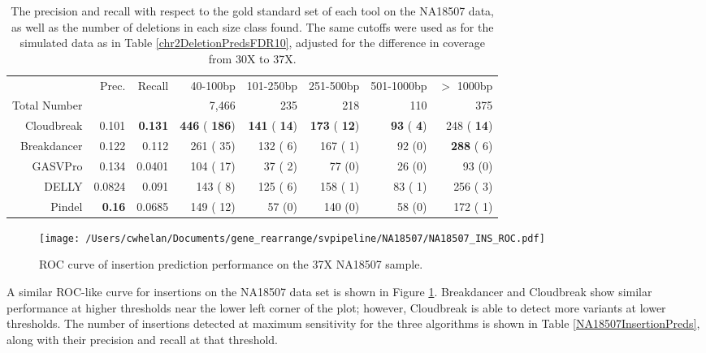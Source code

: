 \documentclass[11pt]{article}
\begin{document}
\begin{table}[t]
\begin{center}
\begin{tabular}{rrr|rrrrr}
  \hline
 & Prec. & Recall & 40-100bp & 101-250bp & 251-500bp & 501-1000bp & $>$ 1000bp \\ 
Total Number & & & 7,466 & 235 & 218 & 110 & 375 \\
  \hline
Cloudbreak & 0.101 & \textbf{0.131} & \textbf{ 446} (\textbf{ 186})  & \textbf{ 141} (\textbf{  14}) &  \textbf{ 173} (\textbf{  12}) & \textbf{  93} (\textbf{   4}) &  248 (\textbf{  14}) \\ 
Breakdancer & 0.122 & 0.112 &  261 (  35)  &  132 (   6) &   167 (   1) &   92 (0) & \textbf{ 288} (   6) \\  
  GASVPro & 0.134 & 0.0401 &  104 (  17)  &   37 (   2) &    77 (0) &   26 (0) &   93 (0) \\ 
  DELLY & 0.0824 & 0.091 &  143 (   8)  &  125 (   6) &   158 (   1) &   83 (   1) &  256 (   3) \\ 
  Pindel & \textbf{0.16} & 0.0685 &  149 (  12)  &   57 (0) &   140 (0) &   58 (0) &  172 (   1) \\ 
   \hline
\end{tabular}
\end{center}
\caption{The precision and recall with respect to the gold standard set of each tool on the NA18507 data, as well as the number of deletions in each size class found. The same cutoffs were used as for the simulated data as in Table \ref{chr2DeletionPredsFDR10}, adjusted for the difference in coverage from 30X to 37X.}
\label{NA18507DeletionPreds}
\end{table}

\begin{figure}[t]
\centering
\texttt{[image: /Users/cwhelan/Documents/gene\_rearrange/svpipeline/NA18507/NA18507\_INS\_ROC.pdf]}
\caption{ROC curve of insertion prediction performance on the 37X NA18507 sample.}
\label{NA18507InsertionsRoc}
\end{figure}

A similar ROC-like curve for insertions on the NA18507 data set is shown in Figure \ref{NA18507InsertionsRoc}. Breakdancer and Cloudbreak show similar performance at higher thresholds near the lower left corner of the plot; however, Cloudbreak is able to detect more variants at lower thresholds. The number of insertions detected at maximum sensitivity for the three algorithms is shown in Table \ref{NA18507InsertionPreds}, along with their precision and recall at that threshold.
\end{document}
